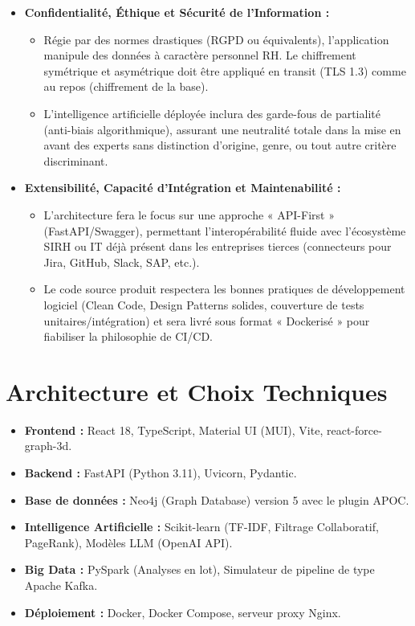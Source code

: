 \documentclass[12pt,a4paper]{article}
\begin{document}
\begin{itemize}[leftmargin=*]
    \item \textbf{Confidentialité, Éthique et Sécurité de l'Information :}
    \begin{itemize}[leftmargin=*, label=-]
        \item Régie par des normes drastiques (RGPD ou équivalents), l'application manipule des données à caractère personnel RH. Le chiffrement symétrique et asymétrique doit être appliqué en transit (TLS 1.3) comme au repos (chiffrement de la base). 
        \item L'intelligence artificielle déployée inclura des garde-fous de partialité (anti-biais algorithmique), assurant une neutralité totale dans la mise en avant des experts sans distinction d'origine, genre, ou tout autre critère discriminant.
    \end{itemize}
    
    \item \textbf{Extensibilité, Capacité d'Intégration et Maintenabilité :}
    \begin{itemize}[leftmargin=*, label=-]
        \item L'architecture fera le focus sur une approche « API-First » (FastAPI/Swagger), permettant l'interopérabilité fluide avec l'écosystème SIRH ou IT déjà présent dans les entreprises tierces (connecteurs pour Jira, GitHub, Slack, SAP, etc.).
        \item Le code source produit respectera les bonnes pratiques de développement logiciel (Clean Code, Design Patterns solides, couverture de tests unitaires/intégration) et sera livré sous format « Dockerisé » pour fiabiliser la philosophie de CI/CD.
    \end{itemize}
\end{itemize}



\section{Architecture et Choix Techniques}

\begin{itemize}[leftmargin=*]
    \item \textbf{Frontend :} React 18, TypeScript, Material UI (MUI), Vite, react-force-graph-3d.
    \item \textbf{Backend :} FastAPI (Python 3.11), Uvicorn, Pydantic.
    \item \textbf{Base de données :} Neo4j (Graph Database) version 5 avec le plugin APOC.
    \item \textbf{Intelligence Artificielle :} Scikit-learn (TF-IDF, Filtrage Collaboratif, PageRank), Modèles LLM (OpenAI API).
    \item \textbf{Big Data :} PySpark (Analyses en lot), Simulateur de pipeline de type Apache Kafka.
    \item \textbf{Déploiement :} Docker, Docker Compose, serveur proxy Nginx.
\end{itemize}
\end{document}
